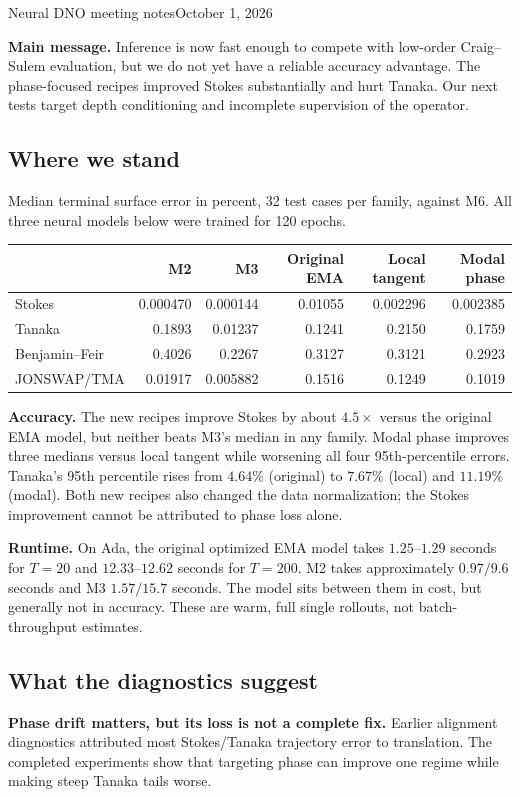 \documentclass[10pt]{article}
\begin{document}
{\Large Neural DNO meeting notes}\hfill October 1, 2026

\textbf{Main message.} Inference is now fast enough to compete with low-order
Craig--Sulem evaluation, but we do not yet have a reliable accuracy advantage.
The phase-focused recipes improved Stokes substantially and hurt Tanaka. Our next
tests target depth conditioning and incomplete supervision of the operator.

\subsection*{Where we stand}
Median terminal surface error in percent, 32 test cases per family, against M6.
All three neural models below were trained for 120 epochs.
\begin{center}
\small
\begin{tabular}{lrrrrr}
\toprule
& M2 & M3 & Original EMA & Local tangent & Modal phase \\
\midrule
Stokes & 0.000470 & 0.000144 & 0.01055 & 0.002296 & 0.002385 \\
Tanaka & 0.1893 & 0.01237 & 0.1241 & 0.2150 & 0.1759 \\
Benjamin--Feir & 0.4026 & 0.2267 & 0.3127 & 0.3121 & 0.2923 \\
JONSWAP/TMA & 0.01917 & 0.005882 & 0.1516 & 0.1249 & 0.1019 \\
\bottomrule
\end{tabular}
\end{center}

\textbf{Accuracy.} The new recipes improve Stokes by about $4.5\times$ versus
the original EMA model, but neither beats M3's median in any family. Modal phase
improves three medians versus local tangent while worsening all four
95th-percentile errors. Tanaka's 95th percentile rises from $4.64\%$ (original)
to $7.67\%$ (local) and $11.19\%$ (modal).
Both new recipes also changed the data normalization; the Stokes improvement
cannot be attributed to phase loss alone.

\textbf{Runtime.} On Ada, the original optimized EMA model takes
$1.25$--$1.29$ seconds for $T=20$ and $12.33$--$12.62$ seconds for $T=200$.
M2 takes approximately $0.97/9.6$ seconds and M3 $1.57/15.7$ seconds.
The model sits between them in cost, but generally not in accuracy.
These are warm, full single rollouts, not batch-throughput estimates.

\subsection*{What the diagnostics suggest}
\textbf{Phase drift matters, but its loss is not a complete fix.}
Earlier alignment diagnostics attributed most Stokes/Tanaka trajectory error
to translation. The completed experiments show that targeting phase can improve
one regime while making steep Tanaka tails worse.
\end{document}
